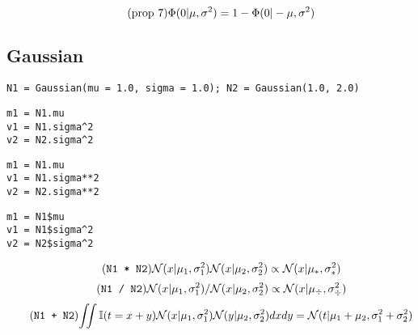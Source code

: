 \documentclass[article]{jss}
\newif\ifen
\newcommand{\en}[1]{\ifen#1\fi}
\newcommand{\N}{\mathcal{N}}
\begin{document}
\begin{equation}\label{eq:phi_simetria} \tag{\text{prop 7}}
\Phi(0|\mu,\sigma^2) = 1-\Phi(0|-\mu,\sigma^2)
\end{equation}

\subsection{Gaussian}\label{sec:Gasussian}

\en{La clase \texttt{Gaussian()} realiza la mayor parte del cómputo en todos los paquetes.}
%
\en{Se representa mediante dos parámetros, la media y el desvío estandar.}
%
\begin{lstlisting}[backgroundcolor=\color{all}, belowskip=-0.77 \baselineskip]
N1 = Gaussian(mu = 1.0, sigma = 1.0); N2 = Gaussian(1.0, 2.0)  
\end{lstlisting}
\begin{paracol}{3}
\begin{lstlisting}[backgroundcolor=\color{julia}]
m1 = N1.mu
v1 = N1.sigma^2
v2 = N2.sigma^2
\end{lstlisting}
\switchcolumn
\begin{lstlisting}[backgroundcolor=\color{python}]
m1 = N1.mu
v1 = N1.sigma**2
v2 = N2.sigma**2
\end{lstlisting}
\switchcolumn
\begin{lstlisting}[backgroundcolor=\color{r}]
m1 = N1$mu
v1 = N1$sigma^2
v2 = N2$sigma^2
\end{lstlisting}
\end{paracol}
%
\en{Esta clase sobreescribe la suma (\texttt{+}), resta (\texttt{-}), producto (\texttt{*}) y división (\texttt{/}) con las principales propiedades requeridas para computar las distribuciones marginales en el modelo TrueSkill Throguth Time.}
%
\begin{equation} \tag{\texttt{N1 * N2}}
 \N(x|\mu_1,\sigma_1^2)\N(x|\mu_2,\sigma_2^2) \propto \N(x|\mu_{*},\sigma_{*}^2)
\end{equation}
%
\begin{equation} \tag{\texttt{N1 / N2}}
 \N(x|\mu_1,\sigma_1^2)/\N(x|\mu_2,\sigma_2^2) \propto \N(x|\mu_{\div},\sigma_{\div}^2)
\end{equation} 
%
\vspace{-0.3cm}
%
\begin{equation} \tag{\texttt{N1 + N2}} \label{eq:suma_normales}
\begin{split}
\iint \mathbb{I}(t = x + y) \N(x|\mu_1, \sigma_1^2)\N(y|\mu_2, \sigma_2^2) dxdy = \N(t|\mu_1+\mu_2,\sigma_1^2 + \sigma_2^2)
\end{split}
\end{equation}
\end{document}
